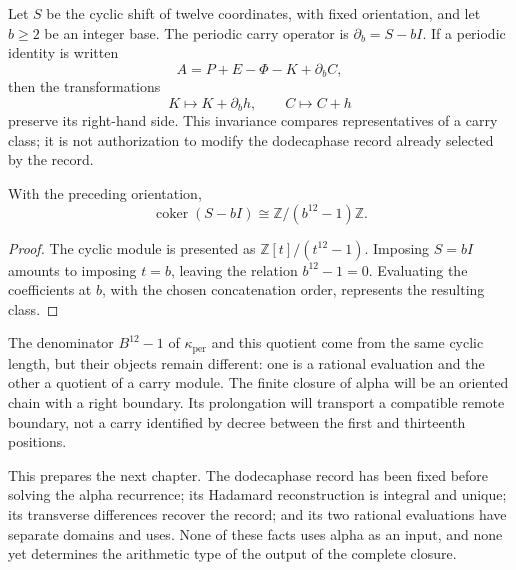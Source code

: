 Let \(S\) be the cyclic shift of twelve coordinates, with fixed
orientation, and let \(b\geq2\) be an integer base. The periodic carry
operator is \(\partial_b=S-bI\). If a periodic identity is written
\[
 A=P+E-\Phi-K+\partial_bC,
\]
then the transformations
\[
 K\longmapsto K+\partial_bh,\qquad C\longmapsto C+h
\]
preserve its right-hand side. This invariance compares representatives of a
carry class; it is not authorization to modify the dodecaphase record already
selected by the record.

\begin{proposition}
\label{prop:k-cociente-acarreo}
With the preceding orientation,
\[
 \operatorname{coker}(S-bI)\cong\mathbb Z/(b^{12}-1)\mathbb Z.
\]
\end{proposition}

\begin{proof}
The cyclic module is presented as
\(\mathbb Z[t]/(t^{12}-1)\). Imposing \(S=bI\) amounts to imposing
\(t=b\), leaving the relation \(b^{12}-1=0\). Evaluating the
coefficients at \(b\), with the chosen concatenation order, represents
the resulting class.
\end{proof}

The denominator \(B^{12}-1\) of \(\kappa_{\mathrm{per}}\) and this
quotient come from the same cyclic length, but their objects remain
different: one is a rational evaluation and the other a quotient
of a carry module. The finite closure of alpha will be an oriented
chain with a right boundary. Its prolongation will transport a
compatible remote boundary, not a carry identified by decree
between the first and thirteenth positions.

This prepares the next chapter. The dodecaphase record has been fixed before
solving the alpha recurrence; its Hadamard reconstruction is
integral and unique; its transverse differences recover the record; and
its two rational evaluations have separate domains and uses. None
of these facts uses alpha as an input, and none yet determines the
arithmetic type of the output of the complete closure.
